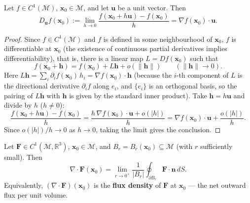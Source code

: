 \begin{proposition}\label{prop:gradient_directional}
Let $f \in C^1(\mathcal{M})$, $\mathbf{x}_0 \in \mathcal{M}$, and let $\mathbf{u}$ be a unit vector. Then
\[
D_{\mathbf{u}} f(\mathbf{x}_0) := \lim_{h\to0}\frac{f(\mathbf{x}_0+h\mathbf{u})-f(\mathbf{x}_0)}{h} = \nabla f(\mathbf{x}_0)\cdot\mathbf{u}.
\]
\end{proposition}

\begin{proof}
Since $f\in C^1(\mathcal M)$ and $f$ is defined in some neighbourhood of $\mathbf x_0$, $f$ is differentiable at $\mathbf x_0$ (the existence of continuous partial derivatives implies differentiability), that is, there is a linear map $L = Df(\mathbf x_0)$ such that
\[
f(\mathbf x_0+\mathbf h) = f(\mathbf x_0) + L\mathbf h + o(\|\mathbf h\|)\qquad(\|\mathbf h\|\to0).
\]
Here $L\mathbf h = \sum_i \partial_i f(\mathbf x_0)\,h_i = \nabla f(\mathbf x_0)\cdot\mathbf h$ (because the $i$-th component of $L$ is the directional derivative $\partial_i f$ along $e_i$, and $\{e_i\}$ is an orthogonal basis, so the pairing of $L\mathbf h$ with $\mathbf h$ is given by the standard inner product). Take $\mathbf h = h\mathbf u$ and divide by $h$ ($h\ne0$):
\[
\frac{f(\mathbf x_0+h\mathbf u)-f(\mathbf x_0)}{h}
= \frac{h\,\nabla f(\mathbf x_0)\cdot\mathbf u + o(|h|)}{h}
= \nabla f(\mathbf x_0)\cdot\mathbf u + \frac{o(|h|)}{h}.
\]
Since $o(|h|)/h \to 0$ as $h\to0$, taking the limit gives the conclusion.
\end{proof}

\begin{proposition}\label{prop:divergence_flux_density}
Let $\mathbf{F} \in C^1(\mathcal{M}, \mathbb{R}^3)$, $\mathbf{x}_0 \in \mathcal{M}$, and $B_r = B_r(\mathbf{x}_0) \subseteq \mathcal M$ (with $r$ sufficiently small). Then
\[
\nabla \cdot \mathbf{F}(\mathbf{x}_0)
= \lim_{r \to 0^{+}} \frac{1}{|B_r|}\oint_{\partial B_r} \mathbf{F} \cdot \mathbf{n} \, dS .
\]
Equivalently, $(\nabla\cdot\mathbf F)(\mathbf x_0)$ is the \textbf{flux density} of $\mathbf F$ at $\mathbf x_0$ --- the net outward flux per unit volume.
\end{proposition}

